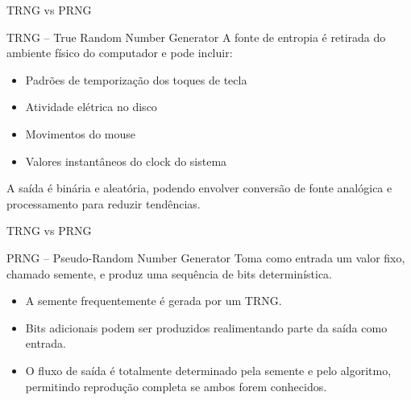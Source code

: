 \begin{frame}{TRNG vs PRNG}
    \begin{block}{TRNG – True Random Number Generator}
        A fonte de entropia é retirada do ambiente físico do computador e pode incluir:
        \begin{itemize}
            \item Padrões de temporização dos toques de tecla
            \item Atividade elétrica no disco
            \item Movimentos do mouse
            \item Valores instantâneos do clock do sistema
        \end{itemize}
        A saída é binária e aleatória, podendo envolver conversão de fonte analógica e processamento para reduzir tendências.
    \end{block}


\end{frame}

\begin{frame}{TRNG vs PRNG}


    \begin{block}{PRNG – Pseudo-Random Number Generator}
        Toma como entrada um valor fixo, chamado semente, e produz uma sequência de bits determinística.
        \begin{itemize}
            \item A semente frequentemente é gerada por um TRNG.
            \item Bits adicionais podem ser produzidos realimentando parte da saída como entrada.
            \item O fluxo de saída é totalmente determinado pela semente e pelo algoritmo, permitindo reprodução completa se ambos forem conhecidos.
        \end{itemize}
    \end{block}
\end{frame}



